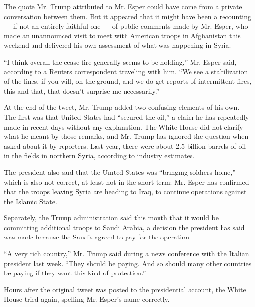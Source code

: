 The quote Mr. Trump attributed to Mr. Esper could have come from a
private conversation between them. But it appeared that it might have
been a recounting --- if not an entirely faithful one --- of public
comments made by Mr. Esper, who
\href{https://www.nytimes.com/2019/10/20/world/asia/mark-esper-afghanistan.html}{made
an unannounced visit to meet with American troops in Afghanistan} this
weekend and delivered his own assessment of what was happening in Syria.

``I think overall the cease-fire generally seems to be holding,'' Mr.
Esper said,
\href{https://twitter.com/idreesali114/status/1185911236036157440}{according
to a Reuters correspondent} traveling with him. ``We see a stabilization
of the lines, if you will, on the ground, and we do get reports of
intermittent fires, this and that, that doesn't surprise me
necessarily.''

At the end of the tweet, Mr. Trump added two confusing elements of his
own. The first was that United States had ``secured the oil,'' a claim
he has repeatedly made in recent days without any explanation. The White
House did not clarify what he meant by those remarks, and Mr. Trump has
ignored the question when asked about it by reporters. Last year, there
were about 2.5 billion barrels of oil in the fields in northern Syria,
\href{https://www.bloomberg.com/news/articles/2019-10-18/trump-baffles-with-claim-to-have-taken-control-of-mideast-oil}{according
to industry estimates}.

The president also said that the United States was ``bringing soldiers
home,'' which is also not correct, at least not in the short term: Mr.
Esper has confirmed that the troops leaving Syria are heading to Iraq,
to continue operations against the Islamic State.

Separately, the Trump administration
\href{https://www.nytimes.com/2019/10/11/world/middleeast/trump-saudi-arabia-iran-troops.html}{said
this month} that it would be committing additional troops to Saudi
Arabia, a decision the president has said was made because the Saudis
agreed to pay for the operation.

``A very rich country,'' Mr. Trump said during a news conference with
the Italian president last week. ``They should be paying. And so should
many other countries be paying if they want this kind of protection.''

Hours after the original tweet was posted to the presidential account,
the White House tried again, spelling Mr. Esper's name correctly.

